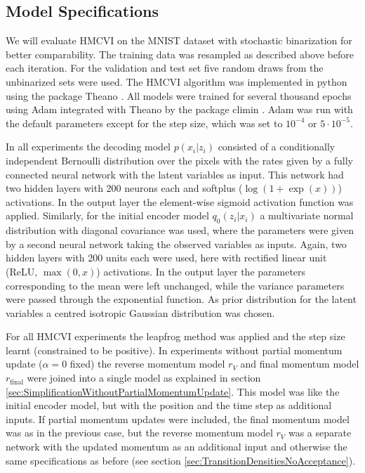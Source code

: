 \subsection{Model Specifications}
\label{sec:ModelSpecifications}
We will evaluate HMCVI on the MNIST dataset with stochastic binarization for better comparability. The training data was resampled as described above before each iteration. For the validation and test set five random draws from the unbinarized sets were used. The HMCVI algorithm was implemented in python using the package Theano \parencite{Bergstra2010, Bastien2012}. All models were trained for several thousand epochs using Adam \parencite{Kingma2015} integrated with Theano by the package climin \parencite{Bayer2015}. Adam was run with the default parameters except for the step size, which was set to $10^{-4}$ or $5 \cdot 10^{-5}$.

In all experiments the decoding model $p(x_i|z_i)$ consisted of a conditionally independent Bernoulli distribution over the pixels with the rates given by a fully connected neural network with the latent variables as input. This network had two hidden layers with 200 neurons each and softplus ($\log(1 + \exp(x))$) activations. In the output layer the element-wise sigmoid activation function was applied. Similarly, for the initial encoder model $q_0(z_i|x_i)$ a multivariate normal distribution with diagonal covariance was used, where the parameters were given by a second neural network taking the observed variables as inputs. Again, two hidden layers with 200 units each were used, here with rectified linear unit (ReLU, $\max(0, x)$) activations. In the output layer the parameters corresponding to the mean were left unchanged, while the variance parameters were passed through the exponential function. As prior distribution for the latent variables a centred isotropic Gaussian distribution was chosen. 

For all HMCVI experiments the leapfrog method was applied and the step size learnt (constrained to be positive). In experiments without partial momentum update ($\alpha = 0$ fixed) the reverse momentum model $r_V$ and final momentum model $r_\textrm{final}$ were joined into a single model as explained in section \ref{sec:SimplificationWithoutPartialMomentumUpdate}. This model was like the initial encoder model, but with the position and the time step as additional inputs. If partial momentum updates were included, the final momentum model was as in the previous case, but the reverse momentum model $r_V$ was a separate network with the updated momentum as an additional input and otherwise the same specifications as before (see section \ref{sec:TransitionDensitiesNoAcceptance}).

